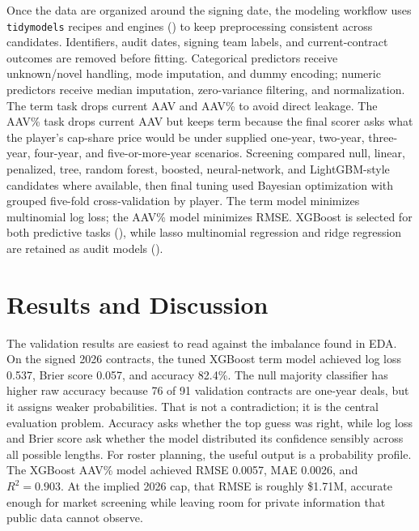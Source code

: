 \documentclass[
  10pt,
]{article}
\begin{document}
Once the data are organized around the signing date, the modeling workflow uses \texttt{tidymodels} recipes and engines () to keep preprocessing consistent across candidates. Identifiers, audit dates, signing team labels, and current-contract outcomes are removed before fitting. Categorical predictors receive unknown/novel handling, mode imputation, and dummy encoding; numeric predictors receive median imputation, zero-variance filtering, and normalization. The term task drops current AAV and AAV\% to avoid direct leakage. The AAV\% task drops current AAV but keeps term because the final scorer asks what the player's cap-share price would be under supplied one-year, two-year, three-year, four-year, and five-or-more-year scenarios. Screening compared null, linear, penalized, tree, random forest, boosted, neural-network, and LightGBM-style candidates where available, then final tuning used Bayesian optimization with grouped five-fold cross-validation by player. The term model minimizes multinomial log loss; the AAV\% model minimizes RMSE. XGBoost is selected for both predictive tasks (), while lasso multinomial regression and ridge regression are retained as audit models ().

\section{Results and Discussion}\label{results-and-discussion}

The validation results are easiest to read against the imbalance found in EDA. On the signed 2026 contracts, the tuned XGBoost term model achieved log loss 0.537, Brier score 0.057, and accuracy 82.4\%. The null majority classifier has higher raw accuracy because 76 of 91 validation contracts are one-year deals, but it assigns weaker probabilities. That is not a contradiction; it is the central evaluation problem. Accuracy asks whether the top guess was right, while log loss and Brier score ask whether the model distributed its confidence sensibly across all possible lengths. For roster planning, the useful output is a probability profile. The XGBoost AAV\% model achieved RMSE 0.0057, MAE 0.0026, and \(R^2 = 0.903\). At the implied 2026 cap, that RMSE is roughly \$1.71M, accurate enough for market screening while leaving room for private information that public data cannot observe.
\end{document}
